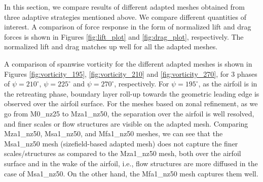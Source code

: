 In this section, we compare results of different adapted meshes obtained from three adaptive strategies mentioned above. 
We compare different quantities of interest. 
A comparison of force response in the form of normalized lift and drag forces is shown in Figures \ref{fig:lift_plot} and \ref{fig:drag_plot}, respectively. The normalized lift and drag matches up well for all the adapted meshes.

A comparison of spanwise vorticity for the different adapted meshes is shown in Figures \ref{fig:vorticity_195}, \ref{fig:vorticity_210} and \ref{fig:vorticity_270}, for 3 phases of $\psi=210^\circ$, $\psi=225^\circ$ and $\psi=270^\circ$, respectively.
For $\psi=195^\circ$, as the airfoil is in the retreating phase, boundary layer roll-up towards the geometric leading edge is observed over the airfoil surface.
For the meshes based on zonal refinement, as we go from M0\_nz25 to Mza1\_nz50, the separation over the airfoil is well resolved, and finer scales or flow structures are visible on the adapted mesh.
Comparing Mza1\_nz50, Msa1\_nz50, and Mfa1\_nz50 meshes, we can see that the Msa1\_nz50 mesh (sizefield-based adapted mesh) does not capture the finer scales/structures as compared to the Mza1\_nz50 mesh, both over the airfoil surface and in the wake of the airfoil, i.e., flow structures are more diffused in the case of Msa1\_nz50.
On the other hand, the Mfa1\_nz50 mesh captures them well.

